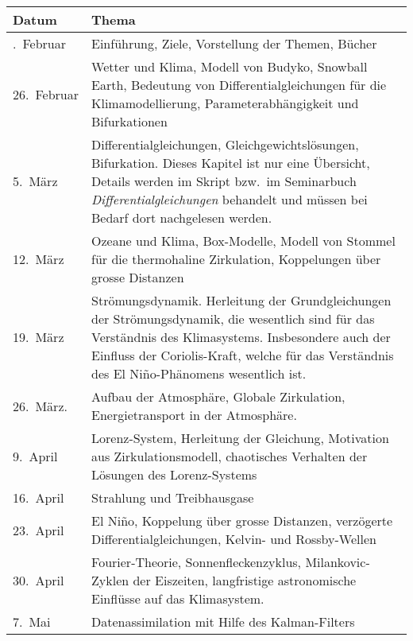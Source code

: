 \documentclass[a4paper,12pt]{article}
\begin{document}
\pagestyle{fancy}
\begin{longtable}{|l|p{14.0cm}|}
\hline
Datum&Thema
\\
\hline
\endhead
\hline
\endfoot
19.~Februar&
Einführung, Ziele, Vorstellung der Themen, Bücher
\\
\hline
26.~Februar&
Wetter und Klima, Modell von Budyko, Snowball Earth,
Bedeutung von Differentialgleichungen für die Klimamodellierung,
Parameterabhängigkeit und Bifurkationen
\\
\hline
\phantom{0}5.~März&
Differentialgleichungen, Gleichgewichtslösungen, Bifurkation.
Dieses Kapitel ist nur eine Übersicht, Details werden im Skript bzw.~im
Seminarbuch {\em Differentialgleichungen} behandelt und müssen bei Bedarf
dort nachgelesen werden.
\\
\hline
12.~März&
Ozeane und Klima, Box-Modelle, Modell von Stommel für die thermohaline
Zirkulation, Koppelungen über grosse Distanzen
\\
\hline
19.~März&
Strömungsdynamik. Herleitung der Grundgleichungen der Strömungsdynamik,
die wesentlich sind für das Verständnis des Klimasystems.
Insbesondere auch der Einfluss der Coriolis-Kraft, welche für das
Verständnis des El Niño-Phänomens wesentlich ist.
\\
\hline
26.~März.&
Aufbau der Atmosphäre, Globale Zirkulation, Energietransport in der
Atmosphäre.
\\
\hline
\phantom{0}9.~April&
Lorenz-System, Herleitung der Gleichung, Motivation aus Zirkulationsmodell,
chaotisches Verhalten der Lösungen des Lorenz-Systems
\\
\hline
16.~April&
Strahlung und Treibhausgase
\\
\hline
23.~April&
El Niño, Koppelung über grosse Distanzen, verzögerte
Differentialgleichungen, Kelvin- und Rossby-Wellen
\\
\hline
30.~April&
Fourier-Theorie, Sonnenfleckenzyklus, Milankovic-Zyklen der Eiszeiten,
langfristige astronomische Einflüsse auf das Klimasystem.
\\
\hline
\phantom{0}7.~Mai&
Datenassimilation mit Hilfe des Kalman-Filters
\end{longtable}
\end{document}
